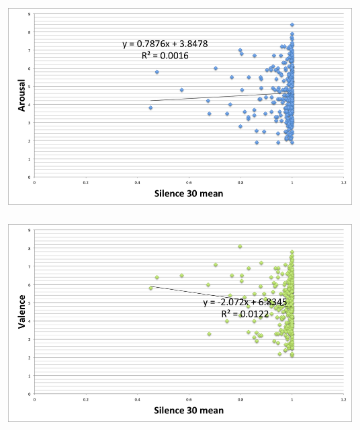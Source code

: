 \begin{figure}
         \centering
        \begin{subfigure}[b]{0.48\textwidth}
                \includegraphics[width=\textwidth]{Figures/silence30mean-arousal}
			   \vspace{20pt}
        \end{subfigure}
        \begin{subfigure}[b]{0.48\textwidth}
                \includegraphics[width=\textwidth]{Figures/silence30mean-valence}
                  \vspace{20pt}
        \end{subfigure}
        

\end{figure}

